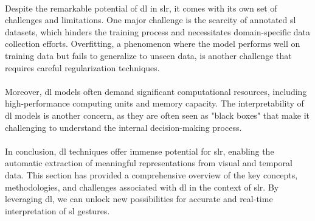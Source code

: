 \paragraph{}
Despite the remarkable potential of \ac{dl} in \ac{slr}, it comes with its own set of challenges and limitations. One major challenge is the scarcity of annotated \ac{sl} datasets, which hinders the training process and necessitates domain-specific data collection efforts. Overfitting, a phenomenon where the model performs well on training data but fails to generalize to unseen data, is another challenge that requires careful regularization techniques.
\paragraph{}
Moreover, \ac{dl} models often demand significant computational resources, including high-performance computing units and memory capacity. The interpretability of \ac{dl} models is another concern, as they are often seen as "black boxes" that make it challenging to understand the internal decision-making process.
\paragraph{}
In conclusion, \ac{dl} techniques offer immense potential for \ac{slr}, enabling the automatic extraction of meaningful representations from visual and temporal data. This section has provided a comprehensive overview of the key concepts, methodologies, and challenges associated with \ac{dl} in the context of \ac{slr}. By leveraging \ac{dl}, we can unlock new possibilities for accurate and real-time interpretation of \ac{sl} gestures.